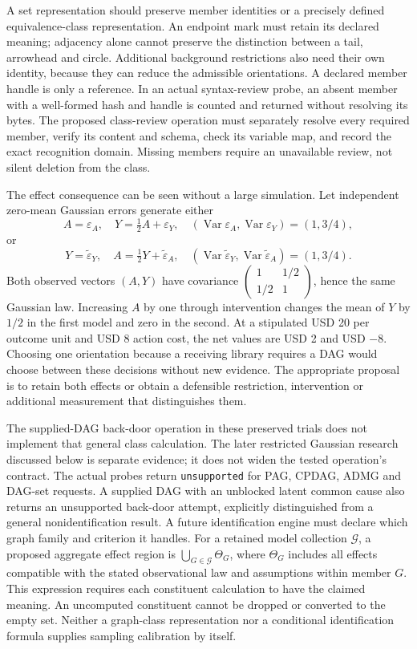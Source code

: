 A set representation should preserve member identities or a precisely defined
equivalence-class representation. An endpoint mark must retain its declared
meaning; adjacency alone cannot preserve the distinction between a tail,
arrowhead and circle. Additional background restrictions also need their own
identity, because they can reduce the admissible orientations. A declared
member handle is only a reference. In an actual syntax-review probe, an absent
member with a well-formed hash and handle is counted and returned without
resolving its bytes. The proposed class-review operation must separately
resolve every required member, verify its content and schema, check its
variable map, and record the exact recognition domain. Missing members require
an unavailable review, not silent deletion from the class.
\citep{exec16_topology_runtime}

The effect consequence can be seen without a large simulation. Let independent
zero-mean Gaussian errors generate either
\[
 A=\varepsilon_A,\quad Y=\tfrac12 A+\varepsilon_Y,
 \quad (\operatorname{Var}\varepsilon_A,\operatorname{Var}\varepsilon_Y)
       =(1,3/4),
\]
or
\[
 Y=\widetilde\varepsilon_Y,\quad A=\tfrac12 Y+\widetilde\varepsilon_A,
 \quad (\operatorname{Var}\widetilde\varepsilon_Y,
        \operatorname{Var}\widetilde\varepsilon_A)=(1,3/4).
\]
Both observed vectors \((A,Y)\) have covariance
\(\left(\begin{smallmatrix}1&1/2\\1/2&1\end{smallmatrix}\right)\), hence the
same Gaussian law. Increasing \(A\) by one through intervention changes the
mean of \(Y\) by \(1/2\) in the first model and zero in the second. At a
stipulated USD 20 per outcome unit and USD 8 action cost, the net values are
USD 2 and USD \(-8\). Choosing one orientation because a receiving library
requires a DAG would choose between these decisions without new evidence.
The appropriate proposal is to retain both effects or obtain a defensible
restriction, intervention or additional measurement that distinguishes them.
\citep{exec16_topology_exact}

The supplied-DAG back-door operation in these preserved trials does not implement that general class calculation. The later restricted Gaussian research discussed below is separate evidence; it does not widen the tested operation's contract. The actual probes return \texttt{unsupported} for PAG,
CPDAG, ADMG and DAG-set requests. A supplied DAG with an unblocked latent
common cause also returns an unsupported back-door attempt, explicitly
distinguished from a general nonidentification result. A future identification
engine must declare which graph family and criterion it handles. For a
retained model collection \(\mathcal G\), a proposed aggregate effect region is
\(\bigcup_{G\in\mathcal G}\Theta_G\), where \(\Theta_G\) includes all effects
compatible with the stated observational law and assumptions within member
\(G\). This expression requires each constituent calculation to have the
claimed meaning. An uncomputed constituent cannot be dropped or converted to
the empty set. Neither a graph-class representation nor a conditional
identification formula supplies sampling calibration by itself.
\citep{exec16_topology_runtime}


